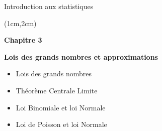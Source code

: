\documentclass{beamer}
\begin{document}

\begin{frame}{Introduction aux statistiques}
\begin{textblock*}{\textwidth}(1cm,2cm)

\begin{center}{\bf \Large Chapitre 3} \end{center}
\begin{center}{\bf \Large Lois des grands nombres et approximations} \end{center}
\vspace{0.3cm}
\begin{itemize}
\item Lois des grands nombres
\item Théorème Centrale Limite
\item Loi Binomiale et loi Normale
\item Loi de Poisson et loi Normale
\end{itemize}

 \end{textblock*}

\end{frame} 

\end{document}
